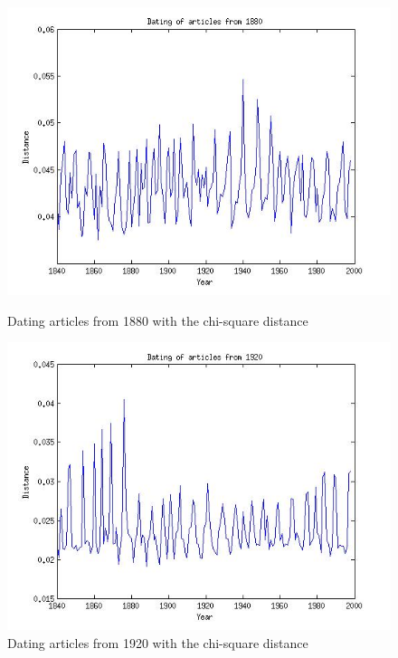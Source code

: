 \begin{figure}[H]
    \begin{minipage}[b]{0.3\linewidth}
        \includegraphics[scale=0.25]{Pictures/date_articles/chi2/dating1880.jpg}
        \caption{Dating articles from 1880 with the chi-square distance}
    \end{minipage}\hfill
    \begin{minipage}[b]{0.3\linewidth}
        \includegraphics[scale=0.25]{Pictures/date_articles/chi2/dating1920.jpg}
        \caption{Dating articles from 1920 with the chi-square distance}
    \end{minipage}\hfill
    \begin{minipage}[b]{0.3\linewidth}

\end{minipage}
\end{figure}
